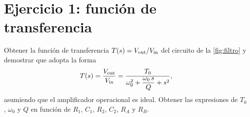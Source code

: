 \section{Ejercicio 1: función de transferencia}\label{sec:transferencia}
\begin{prelab}
Obtener la función de transferencia $T(s)=V_{\mathrm{out}}/V_{\mathrm{in}}$ del circuito de la \cref{fig:filtro} y demostrar que
adopta la forma
\[
  T(s)=\frac{V_{\mathrm{out}}}{V_{\mathrm{in}}}=\frac{T_0}{\omega_0^{2}+\dfrac{\omega_0\,s}{Q}+s^{2}} ,
\]
asumiendo que el amplificador operacional es ideal. Obtener las expresiones de $T_0$, $\omega_0$ y $Q$ en función
de $R_1$, $C_1$, $R_2$, $C_2$, $R_A$ y $R_B$.
\end{prelab}



